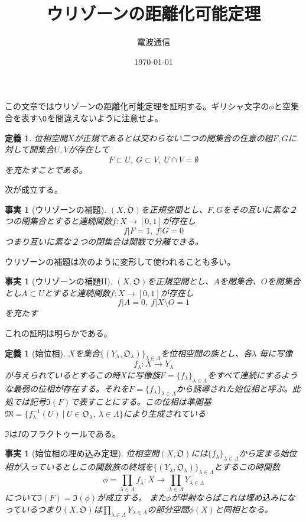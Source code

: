\documentclass{jsarticle}
\title{ウリゾーンの距離化可能定理}
\author{電波通信}
\date{\today}
\newtheorem{defnition}[theorem]{定義}
\newtheorem{fact}[theorem]{事実}
\begin{document}
\maketitle
この文章ではウリゾーンの距離化可能定理を証明する。ギリシャ文字の$\phi$と空集合を表す$\O$を間違えないように注意せよ。

\begin{defnition}
位相空間$X$が正規であるとは交わらない二つの閉集合の任意の組$F,G$に対して開集合$U,V$が存在して
\[
F\subset U,\ G\subset V,\ U\cap V =\emptyset
\]を充たすことである。
\end{defnition}
次が成立する。

\begin{fact}[ウリゾーンの補題]
$(X,\mathfrak{O})$を正規空間とし、$F,G$をその互いに素な２つの閉集合とすると連続関数$f:X\rightarrow [0,1]$が存在し
\[
f|F=1,\ f|G=0
\]つまり互いに素な２つの閉集合は関数で分離できる。
\end{fact}
ウリゾーンの補題は次のように変形して使われることも多い。

\begin{fact}[ウリゾーンの補題II]
$(X,\mathfrak{O})$を正規空間とし、$A$を閉集合、$O$を開集合とし$A\subset U$とすると連続関数$f:X\rightarrow [0,1]$が存在し
\[
f|A=0,\ f|X\setminus O=1
\]を充たす
\end{fact}これの証明は明らかである。

\begin{defnition}[始位相]
$X$を集合$\{(Y_{\lambda},\mathfrak{O}_{\lambda})\}_{\lambda \in \Lambda}$を位相空間の族とし、各$\lambda$ 毎に写像
\[
f_{\lambda}:X\rightarrow Y_{\lambda}
\]が与えられているとするこの時$X$に写像族$F=\{f_{\lambda}\}_{\lambda \in \Lambda}$をすべて連続にするような最弱の位相が存在する。それを$F=\{f_{\lambda}\}_{\lambda \in \Lambda}$から誘導された始位相と呼ぶ。此処では記号$\mathfrak{I}(F)$で表すことにする。この位相は準開基$\mathfrak{M}=\{f_{\lambda}^{-1}(U)\ |\ U\in \mathfrak{O}_{\lambda},\ \lambda\in \Lambda \}$により生成されている
\end{defnition}$\mathfrak{I}$は$I$のフラクトゥールである。

\begin{fact}[始位相の埋め込み定理]\label{main}位相空間$(X,\mathfrak{O})$には$\{f_{\lambda}\}_{\lambda \in \Lambda}$から定まる始位相が入っているとしこの関数族の終域を$\{(Y_{\lambda},\mathfrak{O}_{\lambda})\}_{\lambda \in \Lambda}$とするこの時関数
\[
\phi=\prod_{\lambda\in \Lambda}f_{\lambda}:X\rightarrow \prod_{\lambda\in \Lambda}Y_{\lambda \in \Lambda}
\]について$\mathfrak{I}(F)=\mathfrak{I}(\phi)$が成立する。
また$\phi$が単射ならばこれは埋め込みになっているつまり$(X,\mathfrak{O})$は$\prod_{\lambda\in \Lambda}Y_{\lambda \in \Lambda}$の部分空間$\phi(X)$と同相となる。
\end{fact}
\end{document}
